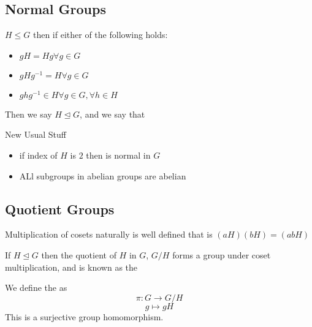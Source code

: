 \documentclass[11pt]{scrartcl}
\begin{document}
\subsection{Normal Groups}
\begin{definitions}
$H\leq G$ then if either of the following holds:
\begin{itemize}
    \item $gH=Hg \forall g\in G$
    \item $gHg^{-1} = H \forall g \in G$
    \item $ghg^{-1} \in H \forall g\in G, \forall h \in H$
\end{itemize}
Then we say $H\mathrel{\unlhd}G$, and we say that 
\end{definitions}
\begin{prop}
    New Usual Stuff
    \begin{itemize}
        \item if index of $H$ is $2$ then is normal in $G$
        \item ALl subgroups in abelian groups are abelian
    \end{itemize}
\end{prop}
\subsection{Quotient Groups}
\begin{prop}
Multiplication of cosets naturally is well defined that is $(aH)(bH)=(abH)$
\end{prop}
\begin{definitions}
If $H \mathrel{\unlhd} G$ then the quotient of $H$ in $G$, $G/H$ forms a group under coset multiplication, and is known as the 
\end{definitions}
\begin{definitions}
We define the  as 
$$\pi : G \rightarrow G/H$$ $$ g \mapsto gH$$
This is a surjective group homomorphism.
\end{definitions}
\end{document}
